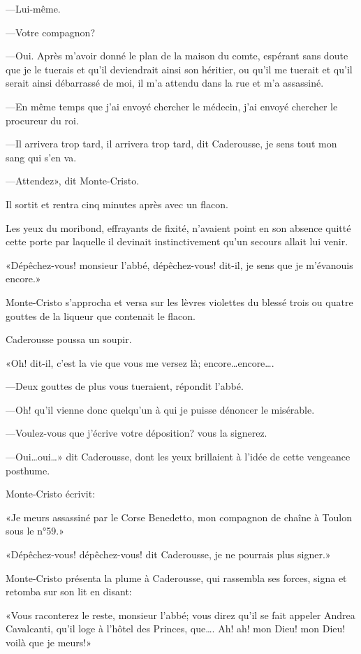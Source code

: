 —Lui-même. 

—Votre compagnon? 

—Oui. Après m'avoir donné le plan de la maison du comte, espérant sans doute que je le tuerais et qu'il deviendrait ainsi son héritier, ou qu'il me tuerait et qu'il serait ainsi débarrassé de moi, il m'a attendu dans la rue et m'a assassiné. 

—En même temps que j'ai envoyé chercher le médecin, j'ai envoyé chercher le procureur du roi. 

—Il arrivera trop tard, il arrivera trop tard, dit Caderousse, je sens tout mon sang qui s'en va. 

—Attendez», dit Monte-Cristo. 

Il sortit et rentra cinq minutes après avec un flacon. 

Les yeux du moribond, effrayants de fixité, n'avaient point en son absence quitté cette porte par laquelle il devinait instinctivement qu'un secours allait lui venir. 

«Dépêchez-vous! monsieur l'abbé, dépêchez-vous! dit-il, je sens que je m'évanouis encore.» 

Monte-Cristo s'approcha et versa sur les lèvres violettes du blessé trois ou quatre gouttes de la liqueur que contenait le flacon. 

Caderousse poussa un soupir. 

«Oh! dit-il, c'est la vie que vous me versez là; encore\dots encore\dots. 

—Deux gouttes de plus vous tueraient, répondit l'abbé. 

—Oh! qu'il vienne donc quelqu'un à qui je puisse dénoncer le misérable. 

—Voulez-vous que j'écrive votre déposition? vous la signerez. 

—Oui\dots oui\dots» dit Caderousse, dont les yeux brillaient à l'idée de cette vengeance posthume. 

Monte-Cristo écrivit: 

«Je meurs assassiné par le Corse Benedetto, mon compagnon de chaîne à Toulon sous le n°59.» 

«Dépêchez-vous! dépêchez-vous! dit Caderousse, je ne pourrais plus signer.» 

Monte-Cristo présenta la plume à Caderousse, qui rassembla ses forces, signa et retomba sur son lit en disant: 

«Vous raconterez le reste, monsieur l'abbé; vous direz qu'il se fait appeler Andrea Cavalcanti, qu'il loge à l'hôtel des Princes, que\dots. Ah! ah! mon Dieu! mon Dieu! voilà que je meurs!» 

